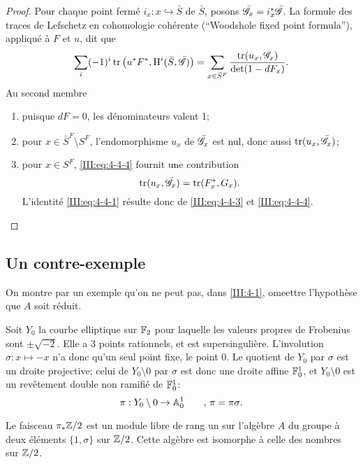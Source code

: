 \begin{proof}
Pour chaque point ferm\'e $i_x:x\hookrightarrow \bar  S$ de $\bar S$, posons 
$\bar{\mathscr{G}}_x = i_x^*\bar{\mathscr{G}}$. La formule des traces de Lefschetz en cohomologie 
coh\'erente (``Woodshole fixed point formula''), appliqu\'e \`a $F$ et $u$, dit 
que 
\begin{equation}\label{III:eq:4-4-4}
  \sum_i (-1)^i \operatorname{tr}\left(u^* F^*, \operatorname{H}^i(\bar S,\bar{\mathscr{G}})\right) = \sum_{x\in \bar S^F} \frac{\operatorname{tr}(u_x,\mathscr{G}_x)}{\det(1-d F_x)} \text{.}
\end{equation}
Au second membre
\begin{enumerate}[\indent a)]
  \item puisque $d F=0$, les d\'enominateurs valent 1;
  \item pour $x\in \bar S^F\setminus S^F$, l'endomorphisme $u_x$ de $\bar{\mathscr{G}}_x$ 
    est nul, donc aussi $\operatorname{tr}(u_x,\bar{\mathscr{G}}_x)$;
  \item pour $x\in S^F$, \eqref{III:eq:4-4-4} fournit une contribution 
    \[
      \operatorname{tr}(u_x,\bar{\mathscr{G}}_x) = \operatorname{tr}(F_x^*,G_x) \text{.}
    \]
    L'identit\'e \eqref{III:eq:4-4-1} r\'esulte donc de \eqref{III:eq:4-4-3} 
    et \eqref{III:eq:4-4-4}. 
\end{enumerate}
\end{proof}





\subsection{Un contre-exemple}\label{III:4-5}

On montre par un exemple qu'on ne peut pas, dans \ref{III:4-1}, omeettre 
l'hypoth\`ese que $A$ soit r\'eduit.

Soit $Y_0$ la courbe elliptique sur $\mathbb{F}_2$ pour laquelle les valeurs propres 
de Frobenius sont $\pm \sqrt{-2}$. Elle a $3$ points rationnels, et est 
supersinguli\`ere. L'involution $\sigma:x\mapsto -x$ n'a donc qu'un seul point 
fixe, le point $0$. Le quotient de $Y_0$ par $\sigma$ est un droite projective; 
celui de $Y_0\setminus 0$ par $\sigma$ est donc une droite affine $\mathbb{F}_0^1$, et 
$Y_0\setminus 0$ est un rev\^etement double non ramifi\'e de $\mathbb{F}_0^1$:
\[
  \pi:Y_0\setminus 0 \to \mathbb{A}_0^1 \qquad \text{, $\pi=\pi\sigma$.}
\]

Le faisceau $\pi_*\mathbb{Z}/2$ est un module libre de rang un sur l'alg\`ebre $A$ du 
groupe \`a deux \'el\'ements $\{1,\sigma\}$ sur $\mathbb{Z}/2$. Cette alg\`ebre est 
isomorphe \`a celle des nombres sur $\mathbb{Z}/2$. 

